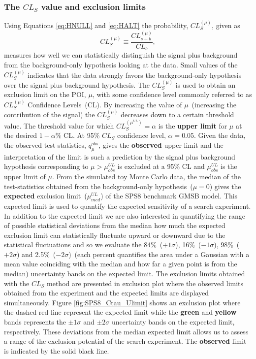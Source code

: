 \subsubsection{The $CL_{S}$ value and exclusion limits} 
Using Equations \ref{eq:HNULL} and \ref{eq:HALT} the probability, $ CL^{(\mu)}_{S}$, given as
\begin{equation}
CL^{(\mu)}_{S} \equiv \frac{CL^{(\mu)}_{s+b} }{ CL_{b}},
\end{equation}
measures how well we can statistically distinguish the signal plus background from the background-only hypothesis looking at the data. Small values of the $CL^{(\mu)}_{S}$ indicates that the data strongly favors the background-only hypothesis over the signal plus background hypothesis.
\newline
The $CL^{(\mu)}_{S}$ is used to obtain an exclusion limit on the POI, $\mu$, with some confidence level commonly referred to as $CL^{(\mu)}_{S}$ Confidence Levels~(CL). By increasing the value of $\mu$~(increasing the contribution of the signal) the $CL^{(\mu)}_{S}$ decreases down to a certain threshold value. The threshold value for which $CL^{(\mu^{UL})}_{S} = \alpha$ is the \textbf{upper limit} for $\mu$ at the desired $1-\alpha$\% CL. At 95\% $CL_{S}$ confidence level, $\alpha = 0.05$. 
\newline
Given the data, the observed test-statistics, $q^{obs}_{\mu}$, gives the \textbf{observed} upper limit and the interpretation of the limit is such a prediction by the signal plus background hypothesis corresponding to $\mu > \mu_{obs}^{UL}$ is excluded at a 95\% CL and $\mu_{obs}^{UL}$ is the upper limit of $\mu$.
\newline
From the simulated toy Monte Carlo data, the median of the test-statistics obtained from the background-only hypothesis~($\mu = 0$) gives the \textbf{expected} exclusion limit~($\mu_{med}^{UL}$) of the SPS8 benchmark GMSB model. This expected limit is used to quantify the expected sensitivity of a search experiment.
\newline
In addition to the expected limit we are also interested in quantifying the range of possible statistical deviations from the median \ie how much the expected exclusion limit can statistically fluctuate upward or downward due to the statistical fluctuations and so we evaluate the 84\%~($+1\sigma$), 16\%~($-1\sigma$), 98\%~($+ 2\sigma$) and 2.5\%~($-2\sigma$)~(each percent quantifies the area under a Gaussian with a mean value coinciding with the median and how far a given point is from the median) uncertainty bands on the expected limit. The exclusion limits obtained with the $CL_{S}$ method are presented in exclusion plot where the observed limits obtained from the experiment and the expected limits are displayed simultaneously. Figure \ref{fig:SPS8_Ctau_Ulimit} shows an exclusion plot where the dashed red line represent the expected limit while the \textbf{green} and \textbf{yellow} bands represents the $\pm1\sigma$ and $\pm2\sigma$ uncertainty bands on the expected limit, respectively. These deviations from the median expected limit allows us to assess a range of the exclusion potential of the search experiment. The \textbf{observed} limit is indicated by the solid black line.
